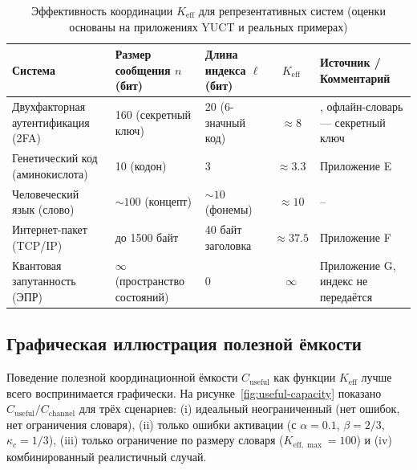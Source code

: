 \documentclass[12pt,a4paper]{article}
\theoremstyle{remark}
\newcommand{\Keff}{K_{\mathrm{eff}}}
\newcommand{\Keffmax}{K_{\mathrm{eff},\max}}
\begin{document}
	\begin{table}[htbp]
		\centering
		\caption{Эффективность координации $\Keff$ для репрезентативных систем (оценки основаны на приложениях YUCT и реальных примерах)}
		\label{tab:keff-examples}
		\footnotesize
		\begin{tabularx}{\textwidth}{XXXcX}
			\toprule
			Система & Размер сообщения $n$ (бит) & Длина индекса $\ell$ (бит) & $\Keff$ & Источник / Комментарий \\
			\midrule
			Двухфакторная аутентификация (2FA) & 160 (секретный ключ) & 20 (6-значный код) & $\approx 8$ & \cite{Yakushev2026b}, офлайн-словарь — секретный ключ \\
			Генетический код (аминокислота) & 10 (кодон) & 3 & $\approx 3.3$ & Приложение E \\
			Человеческий язык (слово) & $\sim 100$ (концепт) & $\sim 10$ (фонемы) & $\approx 10$ & – \\
			Интернет-пакет (TCP/IP) & до 1500 байт & 40 байт заголовка & $\approx 37.5$ & Приложение F \\
			Квантовая запутанность (ЭПР) & $\infty$ (пространство состояний) & 0 & $\infty$ & Приложение G, индекс не передаётся \\
			\bottomrule
		\end{tabularx}
	\end{table}
	
	\subsection{Графическая иллюстрация полезной ёмкости}
	\label{sec:graphical}
	
	Поведение полезной координационной ёмкости $C_{\text{useful}}$ как функции $\Keff$ лучше всего воспринимается графически. На рисунке~\ref{fig:useful-capacity} показано $C_{\text{useful}}/C_{\text{channel}}$ для трёх сценариев: (i) идеальный неограниченный (нет ошибок, нет ограничения словаря), (ii) только ошибки активации (с $\alpha=0.1$, $\beta=2/3$, $\kappa_c=1/3$), (iii) только ограничение по размеру словаря ($\Keffmax=100$) и (iv) комбинированный реалистичный случай.
	
\end{document}
